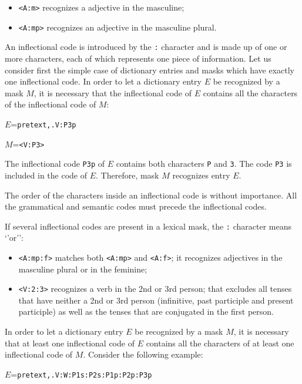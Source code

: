 \begin{itemize}
  \item \verb+<A:m>+ recognizes a adjective in the masculine;
  \item \verb+<A:mp>+ recognizes an adjective in the masculine plural.
\end{itemize}

\noindent An inflectional code is introduced by the \verb+:+ character and
is made up of one or more characters, each of which represents one piece of
information. Let us consider first the simple case of dictionary entries and masks
which have exactly one inflectional code.
In order to let a dictionary entry $E$ be recognized by a mask $M$, it
is necessary that the inflectional code of $E$ contains all the characters
of the inflectional code of $M$:

\bigskip
$E$=\verb$pretext,.V:P3p$

$M$=\verb$<V:P3>$

\bigskip
\noindent The inflectional code \verb+P3p+ of $E$
contains both characters \verb+P+ and \verb+3+. The code \verb+P3+ is
included in the code of $E$. Therefore, mask $M$ recognizes entry $E$.

\bigskip
\noindent The order of the
characters inside an inflectional code is without importance. All the grammatical
and semantic codes must precede the inflectional codes.
 
 \bigskip
 \noindent If several inflectional codes are present in a lexical mask, the \verb+:+
 character means `'or'':
 
\begin{itemize}
  \item \verb+<A:mp:f>+ matches both \verb+<A:mp>+ and \verb+<A:f>+; it
  recognizes adjectives in the masculine plural or in the feminine;
  \item \verb+<V:2:3>+ recognizes a verb in the 2nd or 3rd person; that excludes
  all tenses that have neither a 2nd or 3rd person (infinitive, past participle
  and present participle) as well as the tenses that are conjugated in the first
  person.
\end{itemize}

\noindent In order to let a dictionary entry $E$ be recognized by a mask $M$, it
is necessary that at least one inflectional code of $E$ contains all the characters
of at least one inflectional code of $M$. Consider the following example:

\bigskip
$E$=\verb$pretext,.V:W:P1s:P2s:P1p:P2p:P3p$

